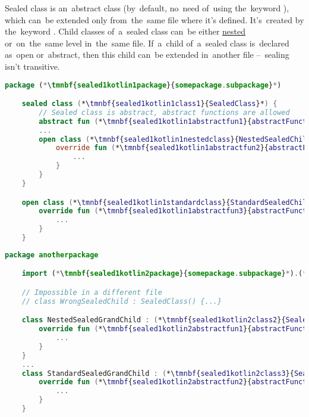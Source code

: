 \label{kotlinsealedclass}
Sealed class is an~abstract class (by~default, no~need of~using the~keyword ), which can~be extended only from~the~same file where it's defined.
It's~created by the~keyword .
Child classes of~a~sealed class can~be either \hyperref[kotlininnerclass]{nested} or~on~the~same level in~the~same file.
If~a~child of~a~sealed class is~declared as~open or~abstract, then this child can~be extended in~another file --~sealing isn't transitive.

\enlargethispage{20mm}
\thispagestyle{empty}
\example
\begin{lstlisting}[language=Kotlin, title={File with a~sealed class}]
    package (*\tmnbf{sealed1kotlin1package}{somepackage.subpackage}*)

    sealed class (*\tmnbf{sealed1kotlin1class1}{SealedClass}*) {
        // Sealed class is abstract, abstract functions are allowed
        abstract fun (*\tmnbf{sealed1kotlin1abstractfun1}{abstractFunction}*)()
        ...
        open class (*\tmnbf{sealed1kotlin1nestedclass}{NestedSealedChild}*) : (*\tmnbf{sealed1kotlin1class2}{SealedClass}*)() {
            override fun (*\tmnbf{sealed1kotlin1abstractfun2}{abstractFunction}*)() {
                ...
            }
        }
    }

    open class (*\tmnbf{sealed1kotlin1standardclass}{StandardSealedChild}*) : (*\tmnbf{sealed1kotlin1class3}{SealedClass}*)() {
        override fun (*\tmnbf{sealed1kotlin1abstractfun3}{abstractFunction}*)() {
            ...
        }
    }
\end{lstlisting}
\begin{lstlisting}[language=Kotlin, title={Another file with extensions of~children of~the~sealed class}]
    package anotherpackage

    import (*\tmnbf{sealed1kotlin2package}{somepackage.subpackage}*).(*\tmnbf{sealed1kotlin2class1}{SealedClass}*)

    // Impossible in a different file
    // class WrongSealedChild : SealedClass() {...}

    class NestedSealedGrandChild : (*\tmnbf{sealed1kotlin2class2}{SealedClass}*).(*\tmnbf{sealed1kotlin2nestedclass}{NestedSealedChild}*)() {
        override fun (*\tmnbf{sealed1kotlin2abstractfun1}{abstractFunction}*)() {
            ...
        }
    }
    ...
    class StandardSealedGrandChild : (*\tmnbf{sealed1kotlin2class3}{SealedClass}*).(*\tmnbf{sealed1kotlin2standardclass}{StandardSealedChild}*)() {
        override fun (*\tmnbf{sealed1kotlin2abstractfun2}{abstractFunction}*)() {
            ...
        }
    }
\end{lstlisting}
